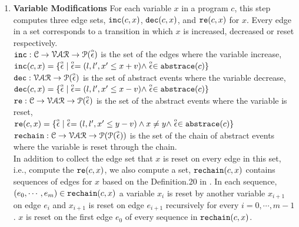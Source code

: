 \begin{enumerate}
\item \textbf{Variable Modifications}
For each variable $x$ in a program $c$, this step computes three edge sets, $\mathtt{inc}(c, x)$, $\mathtt{dec}(c, x)$,
and $\mathtt{re}(c, x)$ for $x$.
Every edge in a set corresponds to a transition in which $x$ is increased,
decreased
or reset
respectively.
\\
$\mathtt{inc}: \mathcal{C} \to \mathcal{VAR} \to \mathcal{P}(\stackrel{\scriptscriptstyle{\alpha}}{\mathtt{\epsilon}{}}) $
is the set of the edges where the variable increase, 
\\
$\mathtt{inc}(c, x) = \{ \stackrel{\scriptscriptstyle{\alpha}}{\mathtt{\epsilon}{}} | \stackrel{\scriptscriptstyle{\alpha}}{\mathtt{\epsilon}{}} = (l, l', x' \leq x + v) \land \stackrel{\scriptscriptstyle{\alpha}}{\mathtt{\epsilon}{}} \in \mathtt{abs}{\mathtt{trace}}(c)\}$
\\
$\mathtt{dec}: \mathcal{VAR} \to \mathcal{P}(\stackrel{\scriptscriptstyle{\alpha}}{\mathtt{\epsilon}{}}) $
is the set of abstract events where the variable decrease,
\\
$\mathtt{dec}(c, x) = \{\stackrel{\scriptscriptstyle{\alpha}}{\mathtt{\epsilon}{}}| \stackrel{\scriptscriptstyle{\alpha}}{\mathtt{\epsilon}{}} = (l, l', x' \leq x - v) \land \stackrel{\scriptscriptstyle{\alpha}}{\mathtt{\epsilon}{}} \in \mathtt{abs}{\mathtt{trace}}(c)\}$
\\
$\mathtt{re}: \mathcal{C} \to \mathcal{VAR} \to \mathcal{P}(\stackrel{\scriptscriptstyle{\alpha}}{\mathtt{\epsilon}{}}) $
is the set of the abstract events where the variable is reset,
\\
$\mathtt{re}(c, x) = \{\stackrel{\scriptscriptstyle{\alpha}}{\mathtt{\epsilon}{}}| \stackrel{\scriptscriptstyle{\alpha}}{\mathtt{\epsilon}{}} = (l, l', x' \leq y - v) \land x \neq y \land \stackrel{\scriptscriptstyle{\alpha}}{\mathtt{\epsilon}{}} \in \mathtt{abs}{\mathtt{trace}}(c)\}$
\\
$\mathtt{rechain}: \mathcal{C} \to \mathcal{VAR} \to \mathcal{P}(\mathcal{P}(\stackrel{\scriptscriptstyle{\alpha}}{\mathtt{\epsilon}{}})) $
is the set of the chain of abstract events where the variable is reset through the chain.
\\
In addition to
collect the edge set that $x$ is reset on every edge in this set, i.e., compute the $\mathtt{re}(c, x)$,
we also compute a set, $\mathtt{rechain}(c, x)$ contains sequences of edges for $x$
based on the Definition.20 in \cite{sinn2017complexity}.
In each sequence, $(e_0, \cdots, e_m) \in \mathtt{rechain}(c, x)$
a variable $x_i$ is reset by another variable $x_{i + 1}$ on edge $e_{i}$
and $x_{i + 1}$ is reset on edge $e_{i + 1}$ recursively
for every $i = 0, \cdots, m - 1$.
$x$ is reset on the first edge $e_0$ of every sequence in $\mathtt{rechain}(c, x)$.
% 
%
\\

\end{enumerate}
